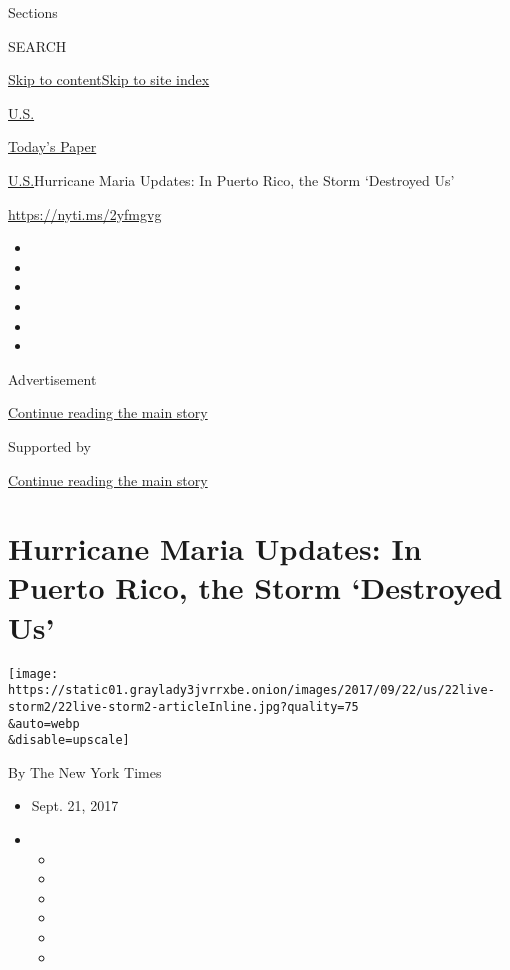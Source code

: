 Sections

SEARCH

\protect\hyperlink{site-content}{Skip to
content}\protect\hyperlink{site-index}{Skip to site index}

\href{https://www.nytimes3xbfgragh.onion/section/us}{U.S.}

\href{https://myaccount.nytimes3xbfgragh.onion/auth/login?response_type=cookie\&client_id=vi}{}

\href{https://www.nytimes3xbfgragh.onion/section/todayspaper}{Today's
Paper}

\href{/section/us}{U.S.}\textbar{}Hurricane Maria Updates: In Puerto
Rico, the Storm `Destroyed Us'

\url{https://nyti.ms/2yfmgvg}

\begin{itemize}
\item
\item
\item
\item
\item
\item
\end{itemize}

Advertisement

\protect\hyperlink{after-top}{Continue reading the main story}

Supported by

\protect\hyperlink{after-sponsor}{Continue reading the main story}

\hypertarget{hurricane-maria-updates-in-puerto-rico-the-storm-destroyed-us}{%
\section{Hurricane Maria Updates: In Puerto Rico, the Storm `Destroyed
Us'}\label{hurricane-maria-updates-in-puerto-rico-the-storm-destroyed-us}}

\texttt{[image: https://static01.graylady3jvrrxbe.onion/images/2017/09/22/us/22live-storm2/22live-storm2-articleInline.jpg?quality=75\\\&auto=webp\\\&disable=upscale]}

By The New York Times

\begin{itemize}
\item
  Sept. 21, 2017
\item
  \begin{itemize}
  \item
  \item
  \item
  \item
  \item
  \item
  \end{itemize}
\end{itemize}

